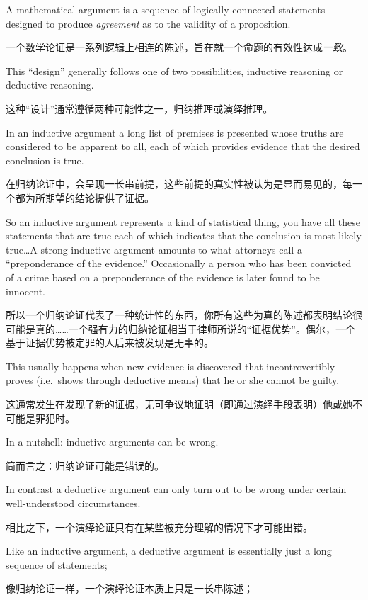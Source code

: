 A mathematical argument is a sequence of logically
connected statements designed to produce {\em agreement} as to the validity
of a proposition.

一个数学论证是一系列逻辑上相连的陈述，旨在就一个命题的有效性达成{\em 一致}。

This ``design'' generally follows one of two possibilities,
inductive reasoning or deductive reasoning.

这种“设计”通常遵循两种可能性之一，归纳推理或演绎推理。

In an inductive argument 
a long list of premises is presented whose truths are considered to be
apparent to all, each of which provides evidence that the desired conclusion
is true.

在归纳论证中，会呈现一长串前提，这些前提的真实性被认为是显而易见的，每一个都为所期望的结论提供了证据。

So an inductive argument represents a kind of statistical thing,
you have all these statements that are true each of which indicates that 
the conclusion is most likely true\ldots  A strong inductive argument
amounts to what attorneys call a ``preponderance of the evidence.''  
Occasionally
a person who has been convicted of a crime based on a preponderance of the 
evidence is later found to be innocent.

所以一个归纳论证代表了一种统计性的东西，你所有这些为真的陈述都表明结论很可能是真的……一个强有力的归纳论证相当于律师所说的“证据优势”。偶尔，一个基于证据优势被定罪的人后来被发现是无辜的。

This usually happens when new evidence
is discovered that incontrovertibly proves (i.e.\ shows through deductive
means) that he or she cannot be guilty.

这通常发生在发现了新的证据，无可争议地证明（即通过演绎手段表明）他或她不可能是罪犯时。

In a nutshell: inductive arguments
can be wrong. 

简而言之：归纳论证可能是错误的。

In contrast a deductive argument can only turn out to be wrong under 
certain well-understood circumstances.

相比之下，一个演绎论证只有在某些被充分理解的情况下才可能出错。

Like an inductive argument, a deductive argument 
is essentially just a
long sequence of statements;

像归纳论证一样，一个演绎论证本质上只是一长串陈述；


